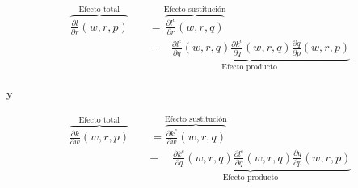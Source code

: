 \documentclass[8pt,a4paper]{extarticle}
\begin{document}
\begin{multicols}{3}
\begin{boxtheo}
	\begin{equation*}
	\begin{aligned}
		\overbrace{\frac{\partial l}{\partial r} (w, r, p)}^{\text{Efecto total}} \quad &= \overbrace{\frac{\partial l^c}{\partial r} (w, r, q)}^{\text{Efecto sustitución}} \\
																						& \underbrace{ - \quad\ \frac{\partial l^c}{\partial q} (w ,r, q) \frac{\partial k^c}{\partial q} (w, r, q) \frac{\partial q}{\partial p} (w, r, p)}_{\text{Efecto producto}}
	\end{aligned}
	\end{equation*}
	
	y

	\begin{equation*}
	\begin{aligned}
		\overbrace{\frac{\partial k}{\partial w} (w, r, p)}^{\text{Efecto total}} \quad &= \overbrace{\frac{\partial k^c}{\partial w} (w, r, q)}^{\text{Efecto sustitución}} \\
																						& \underbrace{ - \quad\ \frac{\partial k^c}{\partial q} (w ,r, q) \frac{\partial l^c}{\partial q} (w, r, q) \frac{\partial q}{\partial p} (w, r, p)}_{\text{Efecto producto}}
	\end{aligned}
	\end{equation*}
	
\end{boxtheo}

\vfill\eject
\columnbreak
\end{multicols}
\end{document}
